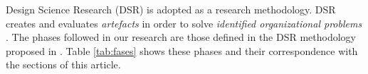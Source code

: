 Design Science Research (DSR) is adopted as a research methodology. DSR creates and evaluates \emph{artefacts} in order to solve \emph{identified organizational problems} \cite{von2004design}. The phases followed in our research are those defined in the DSR methodology proposed in \cite{Vaishnavi}. Table \ref{tab:fases} shows these phases and their correspondence with the sections of this article.
%






